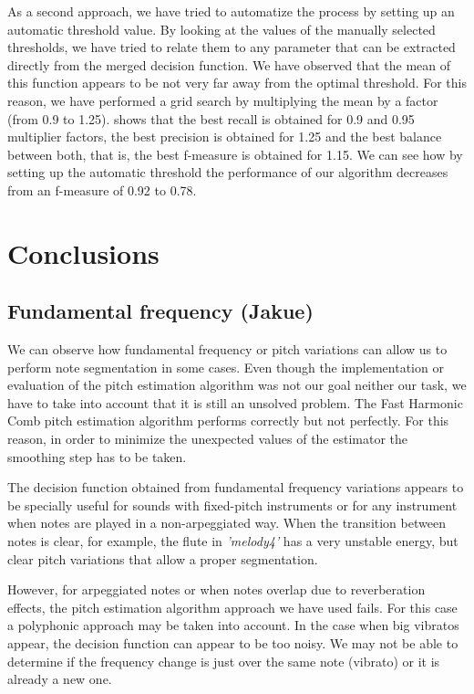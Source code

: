 \documentclass{article}
\begin{document}
As a second approach, we have tried to automatize the process by setting up an automatic threshold value. By looking at the values of the manually selected thresholds, we have tried to relate them to any parameter that can be extracted directly from the merged decision function. We have observed that the mean of this function appears to be not very far away from the optimal threshold. For this reason, we have performed a grid search by multiplying the mean by a factor (from 0.9 to 1.25).  shows that the best recall is obtained for 0.9 and 0.95 multiplier factors, the best precision is obtained for 1.25 and the best balance between both, that is, the best f-measure is obtained for 1.15. We can see how by setting up the automatic threshold the performance of our algorithm decreases from an f-measure of 0.92 to 0.78.

\section{Conclusions}

\subsection{Fundamental frequency (Jakue)}

We can observe how fundamental frequency or pitch variations can allow us to perform note segmentation in some cases. 
Even though the implementation or evaluation of the pitch estimation algorithm was not our goal neither our task, we have to take into account that it is still an unsolved problem. The Fast Harmonic Comb pitch estimation algorithm performs correctly but not perfectly. 
For this reason, in order to minimize the unexpected values of the estimator the smoothing step has to be taken. 

The decision function obtained from fundamental frequency variations appears to be specially useful for sounds with fixed-pitch instruments or for any instrument when notes are played in a non-arpeggiated way. When the transition between notes is clear, for example, the flute in \textit{'melody4'} has a very unstable energy, but clear pitch variations that allow a proper segmentation.

However, for arpeggiated notes or when notes overlap due to reverberation effects, the pitch estimation algorithm approach we have used fails. For this case a polyphonic approach may be taken into account. In the case when big vibratos appear, the decision function can appear to be too noisy. We may not be able to determine if the frequency change is just over the same note (vibrato) or it is already a new one. 
\end{document}

